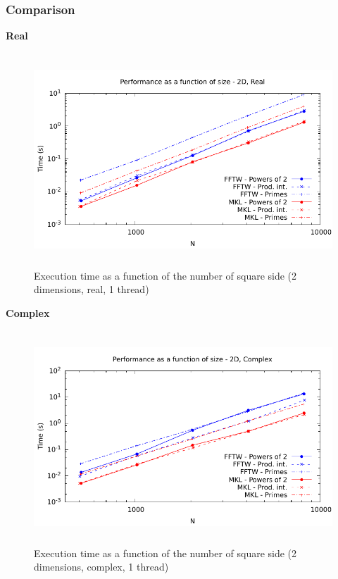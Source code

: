 \documentclass[12pt, a4paper]{article}
\begin{document}
\subsubsection{Comparison}
{\bf Real}
\begin{figure}[H]
\captionsetup{width=0.6\textwidth}
\centering
\includegraphics[height=8cm]{graphs/performance/2d-r.pdf}
\caption{Execution time as a function of the number of square side (2 dimensions, real, 1 thread)}
\label{2DR}
\end{figure}
{\bf Complex}
\begin{figure}[H]
\captionsetup{width=0.6\textwidth}
\centering
\includegraphics[height=8cm]{graphs/performance/2d-c.pdf}
\caption{Execution time as a function of the number of square side (2 dimensions, complex, 1 thread)}
\label{2DC}
\end{figure}   
\end{document}

